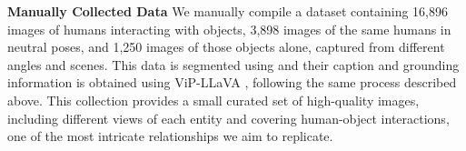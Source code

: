
\textbf{Manually Collected Data} We manually compile a dataset containing 16,896 images of humans interacting with objects, 3,898 images of the same humans in neutral poses, and 1,250 images of those objects alone, captured from different angles and scenes. This data is segmented using \cite{qi2022entityseg} and their caption and grounding information is obtained using ViP-LLaVA \cite{cai2024vip}, following the same process described above. This collection provides a small curated set of high-quality images, including different views of each entity and covering human-object interactions, one of the most intricate relationships we aim to replicate.

